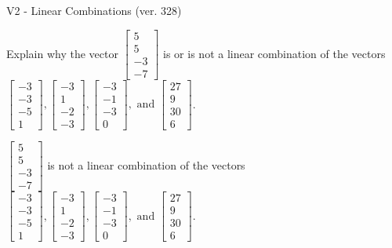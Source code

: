 \begin{exercise}
  \begin{exerciseTitle}V2 - Linear Combinations (ver. 328)\end{exerciseTitle}
  \begin{exerciseStatement}
    Explain why the vector \(\left[\begin{array}{c}
5 \\
5 \\
-3 \\
-7
\end{array}\right]\)  is or is not a linear 
	combination of the vectors \(\left[\begin{array}{c}
-3 \\
-3 \\
-5 \\
1
\end{array}\right] , \left[\begin{array}{c}
-3 \\
1 \\
-2 \\
-3
\end{array}\right] , \left[\begin{array}{c}
-3 \\
-1 \\
-3 \\
0
\end{array}\right] , \text{ and } \left[\begin{array}{c}
27 \\
9 \\
30 \\
6
\end{array}\right]\).
	


  \end{exerciseStatement}
  \begin{exerciseAnswer}
   \(\left[\begin{array}{c}
5 \\
5 \\
-3 \\
-7
\end{array}\right]\) 
  	 is not  
	a linear combination of the vectors \(\left[\begin{array}{c}
-3 \\
-3 \\
-5 \\
1
\end{array}\right] , \left[\begin{array}{c}
-3 \\
1 \\
-2 \\
-3
\end{array}\right] , \left[\begin{array}{c}
-3 \\
-1 \\
-3 \\
0
\end{array}\right] , \text{ and } \left[\begin{array}{c}
27 \\
9 \\
30 \\
6
\end{array}\right]\).


\end{exerciseAnswer}
\end{exercise}

